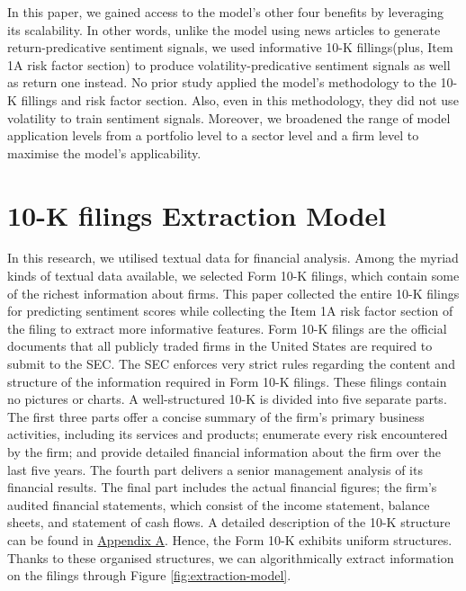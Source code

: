 \documentclass[logo,bsc,singlespacing,parskip]{infthesis}
\begin{document}
In this paper, we gained access to the model’s other four benefits by leveraging its scalability. In other words, unlike the model using news articles to generate return-predicative sentiment signals, we used informative 10-K fillings(plus, Item 1A risk factor section) to produce volatility-predicative sentiment signals as well as return one instead. No prior study applied the model's methodology to the 10-K fillings and risk factor section. Also, even in this methodology, they did not use volatility to train sentiment signals. Moreover, we broadened the range of model application levels from a portfolio level to a sector level and a firm level to maximise the model’s applicability.



\chapter{10-K filings Extraction Model}
\label{extraction-model}
In this research, we utilised textual data for financial analysis. Among the myriad kinds of textual data available, we selected Form 10-K filings, which contain some of the richest information about firms. This paper collected the entire 10-K filings for predicting sentiment scores while collecting the Item 1A risk factor section of the filing to extract more informative features. Form 10-K filings are the official documents that all publicly traded firms in the United States are required to submit to the SEC. The SEC enforces very strict rules regarding the content and structure of the information required in Form 10-K filings. These filings contain no pictures or charts. A well-structured 10-K is divided into five separate parts. The first three parts offer a concise summary of the firm’s primary business activities, including its services and products; enumerate every risk encountered by the firm; and provide detailed financial information about the firm over the last five years. The fourth part delivers a senior management analysis of its financial results. The final part includes the actual financial figures; the firm’s audited financial statements, which consist of the income statement, balance sheets, and statement of cash flows. A detailed description of the 10-K structure can be found in \hyperref[appendix_10-k]{Appendix A}. Hence, the Form 10-K exhibits uniform structures. Thanks to these organised structures, we can algorithmically extract information on the filings through Figure \ref{fig:extraction-model}. \cite{Hering2016, Sha2023} 
\end{document}
